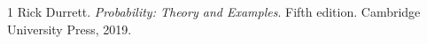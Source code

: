\documentclass[11pt]{article}
\newcommand{\E}{\mathbb E}
\newcommand{\Pb}{\mathbb P}
\newcommand{\Ind}[1]{\mathbf 1\{#1\}}
\begin{document}




\begin{thebibliography}{1}
Rick Durrett.
\textit{Probability: Theory and Examples}.
Fifth edition. Cambridge University Press, 2019.
\end{thebibliography}
\end{document}
